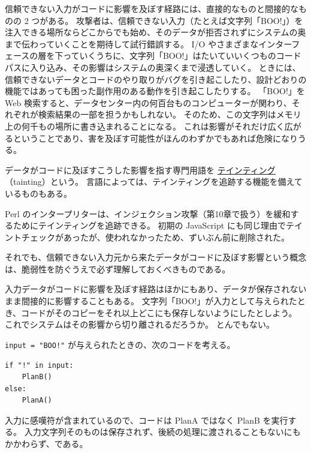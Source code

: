 \documentclass[uplatex]{jsarticle}
\def\label#1{}%
\begin{document}
信頼できない入力がコードに影響を及ぼす経路には、直接的なものと間接的なものの 2 つがある。
攻撃者は、信頼できない入力（たとえば文字列「BOO!」）を注入できる場所ならどこからでも始め、そのデータが拒否されずにシステムの奥まで伝わっていくことを期待して試行錯誤する。
I/O やさまざまなインターフェースの層を下っていくうちに、文字列「BOO!」はたいていいくつものコードパスに入り込み、その影響はシステムの奥深くまで浸透していく。
ときには、信頼できないデータとコードのやり取りがバグを引き起こしたり、設計どおりの機能ではあっても困った副作用のある動作を引き起こしたりする。
「BOO!」を Web 検索すると、データセンター内の何百台ものコンピューターが関わり、それぞれが検索結果の一部を担うかもしれない。
そのため、この文字列はメモリ上の何千もの場所に書き込まれることになる。
これは影響がそれだけ広く広がるということであり、害を及ぼす可能性がほんのわずかでもあれば危険になりうる。

\begin{dfn}[テインティング]\label{dfn:ch8-tainting}
データがコードに及ぼすこうした影響を指す専門用語を \underline{テインティング}（tainting）という。
言語によっては、テインティングを追跡する機能を備えているものもある。
\end{dfn}

\begin{exa}[テインティングを追跡する言語]\label{exa:ch8-taint-languages}
Perl のインタープリターは、インジェクション攻撃（第10章で扱う）を緩和するためにテインティングを追跡できる。
初期の JavaScript にも同じ理由でテイントチェックがあったが、使われなかったため、ずいぶん前に削除された。
\end{exa}

それでも、信頼できない入力元から来たデータがコードに及ぼす影響という概念は、脆弱性を防ぐうえで必ず理解しておくべきものである。

入力データがコードに影響を及ぼす経路はほかにもあり、データが保存されないまま間接的に影響することもある。
文字列「BOO!」が入力として与えられたとき、コードがそのコピーをそれ以上どこにも保存しないようにしたとしよう。
これでシステムはその影響から切り離されるだろうか。
とんでもない。

\begin{exa}[保存されない入力による間接的な影響]\label{exa:ch8-indirect-influence}
\texttt{input = "BOO!"} が与えられたときの、次のコードを考える。
\begin{verbatim}
if "!" in input:
    PlanB()
else:
    PlanA()
\end{verbatim}
入力に感嘆符が含まれているので、コードは PlanA ではなく PlanB を実行する。
入力文字列そのものは保存されず、後続の処理に渡されることもないにもかかわらず、である。
\end{exa}
\end{document}
